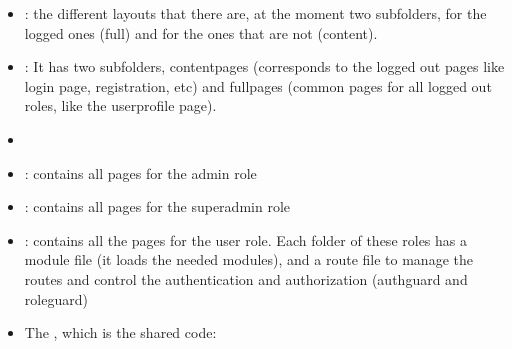 \documentclass[letterpaper,10pt,english]{sphinxmanual}
\begin{document}
\begin{itemize}
\item {} 
: the different layouts that there are, at the moment two subfolders, for the logged ones (full) and for the ones that are not (content).

\item {} 
: It has two subfolders, content\sphinxhyphen{}pages (corresponds to the logged out pages like login page, registration, etc) and full\sphinxhyphen{}pages (common pages for all logged out roles, like the user\sphinxhyphen{}profile page).

\item {} 

\end{itemize}
\begin{itemize}
\item {} 
: contains all pages for the admin role

\item {} 
: contains all pages for the superadmin role

\item {} 
: contains all the pages for the user role.
Each folder of these roles has a module file (it loads the needed modules), and a route file to manage the routes and control the authentication and authorization (auth\sphinxhyphen{}guard and role\sphinxhyphen{}guard)

\end{itemize}
\begin{itemize}
\item {} 
The , which is the shared code:

\end{itemize}
\end{document}
